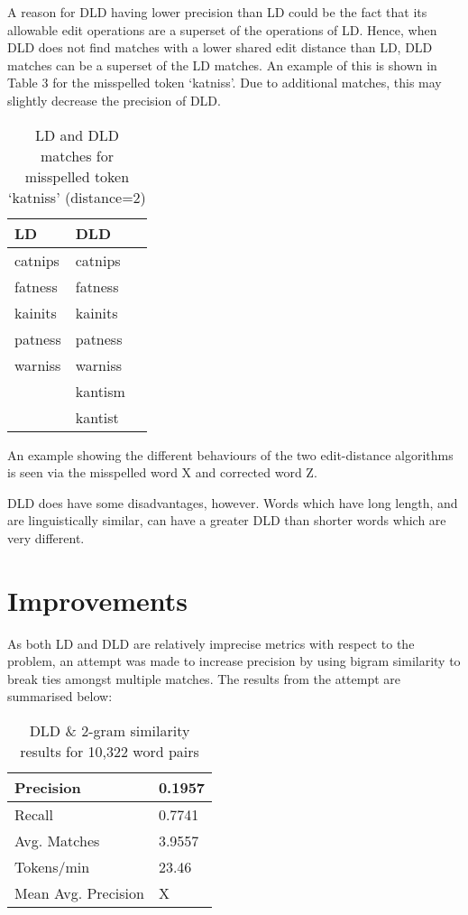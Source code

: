 \documentclass[11pt]{article}
\begin{document}
A reason for DLD having lower precision than LD could be the fact that its allowable edit operations are a superset of the operations of LD. Hence, when DLD does not find matches with a lower shared edit distance than LD, DLD matches can be a superset of the LD matches. An example of this is shown in Table 3 for the misspelled token `katniss'. Due to additional matches, this may slightly decrease the precision of DLD.
\begin{table}
\begin{center}
\begin{tabular}{ |l|l|l| }
\hline
LD & DLD \\
\hline
catnips & catnips\\
fatness & fatness\\ 
kainits & kainits\\
patness & patness\\
warniss & warniss\\
 & kantism\\
 & kantist\\
\hline
\end{tabular}
\caption{LD and DLD matches for misspelled token `katniss' (distance=2)}\label{table3}
\end{center}
\end{table}
An example showing the different behaviours of the two edit-distance algorithms is seen via the misspelled word X and corrected word Z.

DLD does have some disadvantages, however. Words which have long length, and are linguistically similar, can have a greater DLD than shorter words which are very different.


\section{Improvements}
As both LD and DLD are relatively imprecise metrics with respect to the problem, an attempt was made to increase precision by using bigram similarity to break ties amongst multiple matches. The results from the attempt are summarised below:


\begin{table}[h]
\begin{center}
\begin{tabular}{|l|l|}
      \hline
      Precision & 0.1957\\
      \hline
      Recall & 0.7741\\
      \hline
      Avg. Matches & 3.9557\\
      \hline
      Tokens/min & 23.46\\
      \hline
      Mean Avg. Precision & X\\
      \hline
\end{tabular}
\caption{DLD \& 2-gram similarity results for 10,322 word pairs}\label{table2}
\end{center}
\end{table}
\end{document}
